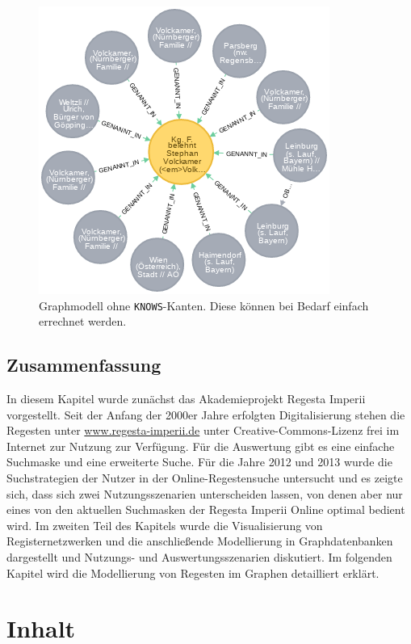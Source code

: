 \documentclass[ngerman,]{scrreprt}
\begin{document}
\begin{figure}
\centering
\includegraphics{Bilder/1zu1-Beziehungen-nur-Regest.png}
\caption{Graphmodell ohne \texttt{KNOWS}-Kanten. Diese können bei Bedarf einfach errechnet werden.}
\end{figure}

\section{Zusammenfassung}\label{zusammenfassung-1}

In diesem Kapitel wurde zunächst das Akademieprojekt Regesta Imperii vorgestellt. Seit der Anfang der 2000er Jahre erfolgten Digitalisierung stehen die Regesten unter \url{www.regesta-imperii.de} unter Creative-Commons-Lizenz frei im Internet zur Nutzung zur Verfügung. Für die Auswertung gibt es eine einfache Suchmaske und eine erweiterte Suche. Für die Jahre 2012 und 2013 wurde die Suchstrategien der Nutzer in der Online-Regestensuche untersucht und es zeigte sich, dass sich zwei Nutzungsszenarien unterscheiden lassen, von denen aber nur eines von den aktuellen Suchmasken der Regesta Imperii Online optimal bedient wird. Im zweiten Teil des Kapitels wurde die Visualisierung von Registernetzwerken und die anschließende Modellierung in Graphdatenbanken dargestellt und Nutzungs- und Auswertungsszenarien diskutiert. Im folgenden Kapitel wird die Modellierung von Regesten im Graphen detailliert erklärt.

\chapter{Inhalt}\label{inhalt-3}
\end{document}

